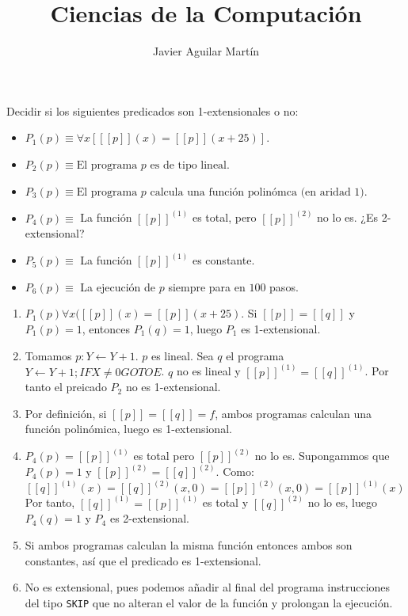 \documentclass[twoside]{article}
\begin{document}
\title{Ciencias de la Computación}

\author{Javier Aguilar Martín}
\maketitle

\begin{ejercicio}{1}
Decidir si los siguientes predicados son 1-extensionales o no:
\begin{itemize}
	\item $P_1(p) \equiv \forall x [[\![p]\!](x) = [[p]](x+25)]$.
	\item $P_2(p) \equiv \text{El programa }p\text{ es de tipo lineal}$.
	\item $P_3(p) \equiv \text{El programa }p\text{ calcula una función polinómca (en aridad 1)}$.
	\item $P_4(p) \equiv$ La función $[[p]]^{(1)}$ es total, pero $[[p]]^{(2)}$ no lo es. ¿Es 2-extensional?
	\item $P_5(p) \equiv$ La función $[[p]]^{(1)}$ es constante.
	\item $P_6(p) \equiv$ La ejecución de $p$ siempre para en $100$ pasos.
\end{itemize}
\end{ejercicio}
\begin{solucion}
\end{solucion}
\begin{enumerate}
	\item $P_1(p)  \forall x ( [[p]](x) = [[p]](x+25)$. Si $[[p]]=[[q]]$ y $P_1(p) = 1$, entonces $P_1(q) = 1$, luego $P_1$ es 1-extensional.
	
	\item Tomamos $p : Y \leftarrow Y+1$. $p$ es lineal. Sea $q$ el programa $Y \leftarrow Y+1; IF X \neq 0 GOTO E$. $q$ no es lineal y $[[p]]^{(1)} = [[q]]^{(1)}$. Por tanto el preicado $P_2$ no es 1-extensional.
	
	\item Por definición, si $[[p]]=[[q]]=f$, ambos programas calculan una función polinómica, luego es 1-extensional.
	\item $P_4(p) = [[p]]^{(1)}$ es total pero $[[p]]^{(2)}$ no lo es. Supongammos que $P_4(p) = 1$ y $[[p]]^{(2)} = [[q]]^{(2)}$. Como:
	\[ [[q]]^{(1)}(x) = [[q]]^{(2)}(x,0) = [[p]]^{(2)}(x,0) = [[p]]^{(1)}(x) \]
	Por tanto, $[[q]]^{(1)} = [[p]]^{(1)}$ es total y $[[q]]^{(2)}$ no lo es, luego $P_4(q) = 1$ y $P_4$ es 2-extensional.
	\item Si ambos programas calculan la misma función entonces ambos son constantes, así que el predicado es 1-extensional.
	\item No es extensional, pues podemos añadir al final del programa instrucciones del tipo \texttt{SKIP} que no alteran el valor de la función y prolongan la ejecución. 
\end{enumerate}
\end{document}
